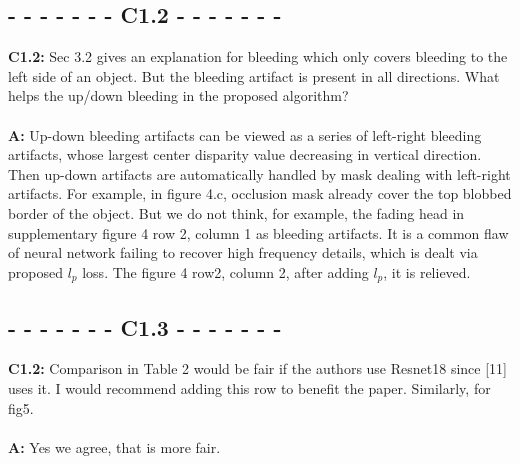 \documentclass[10pt,twocolumn,letterpaper]{article}
\begin{document}
\subsection*{- - - - - - - C1.2 - - - - - - -}
\noindent\textbf{C1.2:} Sec 3.2 gives an explanation for bleeding which only covers bleeding to the left side of an object. But the bleeding artifact is present in all directions. What helps the up/down bleeding in the proposed algorithm? \\ \\
\noindent\textbf{A:} Up-down bleeding artifacts can be viewed as a series of left-right bleeding artifacts, whose largest center disparity value decreasing in vertical direction. Then up-down artifacts are automatically handled by mask dealing with left-right artifacts. For example, in figure 4.c, occlusion mask already cover the top blobbed border of the object. But we do not think, for example, the fading head in supplementary figure 4 row 2, column 1 as bleeding artifacts. It is a common flaw of neural network failing to recover high frequency details, which is dealt via proposed $l_p$ loss. The figure 4 row2, column 2, after adding $l_p$, it is relieved.
\subsection*{- - - - - - - C1.3 - - - - - - -}
\noindent\textbf{C1.2:} Comparison in Table 2 would be fair if the authors use Resnet18 since [11] uses it. I would recommend adding this row to benefit the paper. Similarly, for fig5. \\ \\
\noindent\textbf{A:} Yes we agree, that is more fair.
{\small


}
\end{document}
